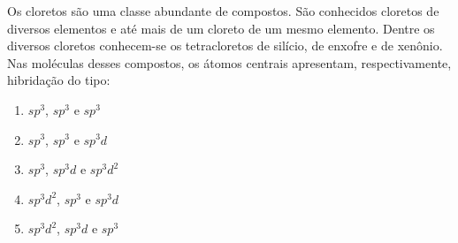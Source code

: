 Os cloretos são uma classe abundante de compostos. São conhecidos cloretos de diversos elementos e até mais de um cloreto de um mesmo elemento. Dentre os diversos cloretos conhecem-se os tetracloretos de silício, de enxofre e de xenônio. Nas moléculas desses compostos, os átomos centrais apresentam, respectivamente, hibridação do tipo:

\begin{enumerate}[label = (\alph*)]
	\item $sp^3$, $sp^3$ e $sp^3$
	\item $sp^3$, $sp^3$ e $sp^3d$
	\item $sp^3$, $sp^3d$ e $sp^3d^2$
	\item $sp^3d^2$, $sp^3$ e $sp^3d$
	\item $sp^3d^2$, $sp^3d$ e $sp^3$
\end{enumerate}
